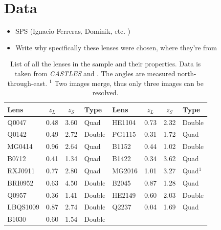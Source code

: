 \documentclass[useAMS,usenatbib]{mn2e}
\begin{document}
\section{Data}\label{sec:data}
\begin{itemize}
\item SPS (Ignacio Ferreras, Dominik, etc. \citep{2011ApJ...740...97L})
\item Write why specifically these lenses were chosen, where they're from
\end{itemize}



\begin{table}
 \begin{center}
  \begin{tabular}{l c c l | l c c l}
   Lens & $z_{L}$ & $z_{S}$ & Type & Lens & $z_{L}$ & $z_{S}$ & Type\\ \hline \hline
   Q0047 & 0.48 & 3.60 & Quad & HE1104 & 0.73 & 2.32 & Double\\
   Q0142 & 0.49 & 2.72 & Double & PG1115 & 0.31 & 1.72 & Quad\\
   MG0414 & 0.96 & 2.64 & Quad & B1152 & 0.44 & 1.02 & Double\\
   B0712 & 0.41 & 1.34 & Quad & B1422 & 0.34 & 3.62 & Quad\\
   RXJ0911 & 0.77 & 2.80 & Quad & MG2016 & 1.01 & 3.27 & Quad$^{1}$\\
   BRI0952 & 0.63 & 4.50 & Double & B2045 & 0.87 & 1.28 & Quad\\
   Q0957 & 0.36 & 1.41 & Double & HE2149 & 0.60 & 2.03 & Double\\
   LBQS1009 & 0.87 & 2.74 & Double & Q2237 & 0.04 & 1.69 & Quad\\
   B1030 & 0.60 & 1.54 & Double & & & & \\
  \end{tabular}
  \caption{List of all the lenses in the sample and their properties. Data is taken from \textit{CASTLES} and \cite{leier11phd}. The angles are measured north-through-east. \newline $^{1}$ Two images merge, thus only three images can be resolved.}
  \label{tab:overview}
 \end{center}
\end{table}
\end{document}
